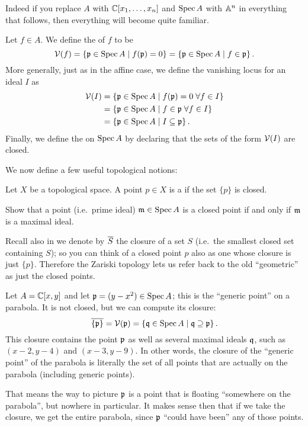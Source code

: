 Indeed if you replace $A$ with $\mathbb C[x_1, \dots, x_n]$
and $\operatorname{Spec} A$ with $\mathbb A^n$ in everything that follows,
then everything will become quite familiar.

\begin{definition}
	Let $f \in A$. We define the  of $f$ to be
	\[ \mathcal V(f) = \left\{ \mathfrak p \in \operatorname{Spec} A \mid f(\mathfrak p) = 0 \right\}
		= \left\{ \mathfrak p \in \operatorname{Spec} A \mid f \in \mathfrak p \right\}. \]
	More generally, just as in the affine case,
	we define the vanishing locus for an ideal $I$ as
	\begin{align*}
		\mathcal V(I) &= \left\{ \mathfrak p \in \operatorname{Spec} A \mid f(\mathfrak p)=0 \; \forall f \in I \right\} \\
		&= \left\{ \mathfrak p \in \operatorname{Spec} A \mid f \in \mathfrak p \; \forall f \in I \right\} \\
		&= \left\{ \mathfrak p \in \operatorname{Spec} A \mid I \subseteq \mathfrak p \right\}.
	\end{align*}
	Finally, we define the  on $\operatorname{Spec} A$
	by declaring that the sets of the form $\mathcal V(I)$ are closed.
\end{definition}

We now define a few useful topological notions:
\begin{definition}
	Let $X$ be a topological space.
	A point $p \in X$ is a 
	if the set $\{p\}$ is closed.
\end{definition}
\begin{ques}
	[Mandatory]
	Show that a point (i.e.\ prime ideal)
	$\mathfrak m \in \operatorname{Spec} A$ is a closed point
	if and only if $\mathfrak m$ is a maximal ideal.
\end{ques}
Recall also in  we denote by $\overline S$
the closure of a set $S$ (i.e.\ the smallest closed set containing $S$);
so you can think of a closed point $p$ also
as one whose closure is just $\{p\}$.
Therefore the Zariski topology lets us refer back to the old ``geometric''
as just the closed points.

\begin{example}
	Let $A = \mathbb C[x,y]$ and let $\mathfrak p = (y-x^2) \in \operatorname{Spec} A$;
	this is the ``generic point'' on a parabola.
	It is not closed, but we can compute its closure:
	\[
		\overline{\{\mathfrak p\}}
		= \mathcal V(\mathfrak p) = \left\{ \mathfrak q \in \operatorname{Spec} A \mid \mathfrak q \supseteq \mathfrak p \right\}.
	\]
	This closure contains the point $\mathfrak p$ as well
	as several maximal ideals $\mathfrak q$, such as $(x-2,y-4)$ and $(x-3,y-9)$.
	In other words, the closure of the ``generic point'' of the parabola
	is literally the set of all points that are actually on the parabola
	(including generic points).

	That means the way to picture $\mathfrak p$ is a point that
	is floating ``somewhere on the parabola'', but nowhere in particular.
	It makes sense then that if we take the closure,
	we get the entire parabola,
	since $\mathfrak p$ ``could have been'' any of those points.
\end{example}

